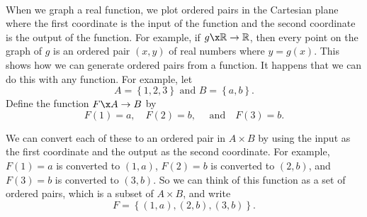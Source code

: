 \begin{previewactivity} \label{PA:functionasordered} \hfill \\
When we graph a real function, we plot ordered pairs in the Cartesian plane where the first coordinate is the input of the function and the second coordinate is the output of the function.  For example, if  $g\x \mathbb{R} \to \mathbb{R}$, then every point on the graph of  $g$  is an ordered pair  $( {x, y} )$ of real numbers where  $y = g( x )$.  This shows how we can generate ordered pairs from a function.  It happens that we can do this with any function.
For example, let  
\[
A = \left\{ {1, 2, 3} \right\} \text{ and } B = \left\{ {a, b} \right\}.
\]
Define the function  $F\x A \to B$ by  
\[
  F( 1 ) = a, \quad  
  F( 2 ) = b, \quad \text{ and} \quad 
  F( 3 ) = b. 
\]

We can convert each of these to an ordered pair in  $A \times B$ by using the input as the first coordinate and the output as the second coordinate.  For example, 
$F( 1 ) = a$ is converted to $( 1, a )$, 
$F( 2 ) = b$ is converted to $( 2, b )$, and 
$F( 3 ) = b$ is converted to $( 3, b )$.  So we can think of this function as a set of ordered pairs, which is a subset of  $A \times B$, and write
\[
F = \left\{ {( {1, a} ), ( {2, b} ), ( {3, b} )} \right\}\!.
\]


\end{previewactivity}
